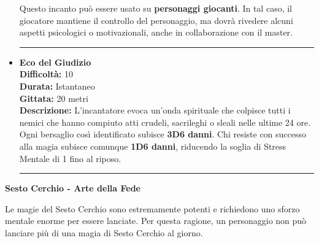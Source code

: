 \documentclass[../manuale_main.tex]{subfiles}
\begin{document}
\begin{itemize}
Questo incanto può essere usato su \textbf{personaggi giocanti}. In tal caso, il giocatore mantiene il controllo del personaggio, ma dovrà rivedere alcuni aspetti psicologici o motivazionali, anche in collaborazione con il master.

\vspace{0.5cm}\rule{\textwidth}{0.4pt}\vspace{1cm}

\item \textbf{Eco del Giudizio} \\
\textbf{Difficoltà:} 10 \\
\textbf{Durata:} Istantaneo \\
\textbf{Gittata:} 20 metri \\
\textbf{Descrizione:} L’incantatore evoca un’onda spirituale che colpisce tutti i nemici che hanno compiuto atti crudeli, sacrileghi o sleali nelle ultime 24 ore. Ogni bersaglio così identificato subisce \textbf{3D6 danni}. Chi resiste con successo alla magia subisce comunque \textbf{1D6 danni}, riducendo la soglia di Stress Mentale di 1 fino al riposo.


\vspace{0.5cm}\rule{\textwidth}{0.4pt}\vspace{1cm}


\end{itemize}

\clearpage
\vspace{0.2cm}
{\zarafirtitlefont\Large\bfseries Sesto Cerchio - Arte della Fede}

Le magie del Sesto Cerchio sono estremamente potenti e richiedono uno sforzo mentale enorme per essere lanciate. Per questa ragione, un personaggio non può lanciare più di una magia di Sesto Cerchio al giorno.
\end{document}
